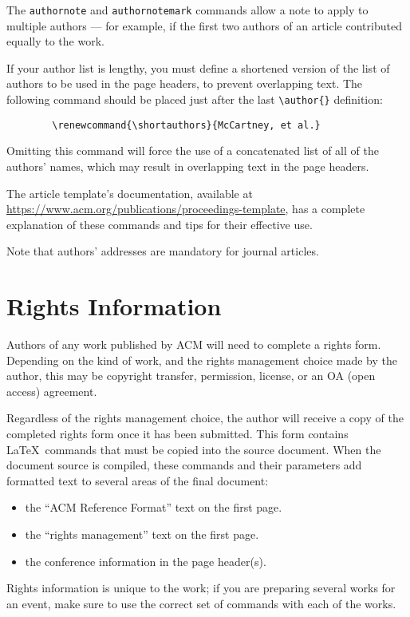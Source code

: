 \documentclass[acmsmall]{acmart}
\begin{document}
	The \verb|authornote| and \verb|authornotemark| commands allow a note
	to apply to multiple authors --- for example, if the first two authors
	of an article contributed equally to the work.
	
	If your author list is lengthy, you must define a shortened version of
	the list of authors to be used in the page headers, to prevent
	overlapping text. The following command should be placed just after
	the last \verb|\author{}| definition:
	\begin{verbatim}
		\renewcommand{\shortauthors}{McCartney, et al.}
	\end{verbatim}
	Omitting this command will force the use of a concatenated list of all
	of the authors' names, which may result in overlapping text in the
	page headers.
	
	The article template's documentation, available at
	\url{https://www.acm.org/publications/proceedings-template}, has a
	complete explanation of these commands and tips for their effective
	use.
	
	Note that authors' addresses are mandatory for journal articles.
	
	\section{Rights Information}
	
	Authors of any work published by ACM will need to complete a rights
	form. Depending on the kind of work, and the rights management choice
	made by the author, this may be copyright transfer, permission,
	license, or an OA (open access) agreement.
	
	Regardless of the rights management choice, the author will receive a
	copy of the completed rights form once it has been submitted. This
	form contains \LaTeX\ commands that must be copied into the source
	document. When the document source is compiled, these commands and
	their parameters add formatted text to several areas of the final
	document:
	\begin{itemize}
		\item the ``ACM Reference Format'' text on the first page.
		\item the ``rights management'' text on the first page.
		\item the conference information in the page header(s).
	\end{itemize}
	
	Rights information is unique to the work; if you are preparing several
	works for an event, make sure to use the correct set of commands with
	each of the works.
	
\end{document}
